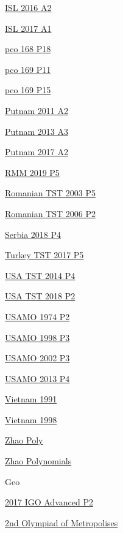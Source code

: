 \hyperref  [problem:ISL 2016 A2]{ISL 2016 A2}

\hyperref  [problem:ISL 2017 A1]{ISL 2017 A1}

\hyperref  [problem:pco 168 P18]{pco 168 P18}

\hyperref  [problem:pco 169 P11]{pco 169 P11}

\hyperref  [problem:pco 169 P15]{pco 169 P15}

\hyperref  [problem:Putnam 2011 A2]{Putnam 2011 A2}

\hyperref  [problem:Putnam 2013 A3]{Putnam 2013 A3}

\hyperref  [problem:Putnam 2017 A2]{Putnam 2017 A2}

\hyperref  [problem:RMM 2019 P5]{RMM 2019 P5}

\hyperref  [problem:Romanian TST 2003 P5]{Romanian TST 2003 P5}

\hyperref  [problem:Romanian TST 2006 P2]{Romanian TST 2006 P2}

\hyperref  [problem:Serbia 2018 P4]{Serbia 2018 P4}

\hyperref  [problem:Turkey TST 2017 P5]{Turkey TST 2017 P5}

\hyperref  [problem:USA TST 2014 P4]{USA TST 2014 P4}

\hyperref  [problem:USA TST 2018 P2]{USA TST 2018 P2}

\hyperref  [problem:USAMO 1974 P2]{USAMO 1974 P2}

\hyperref  [problem:USAMO 1998 P3]{USAMO 1998 P3}

\hyperref  [problem:USAMO 2002 P3]{USAMO 2002 P3}

\hyperref  [problem:USAMO 2013 P4]{USAMO 2013 P4}

\hyperref  [problem:Vietnam 1991]{Vietnam 1991}

\hyperref  [problem:Vietnam 1998]{Vietnam 1998}

\hyperref  [problem:Zhao Poly]{Zhao Poly}

\hyperref  [problem:Zhao Polynomials]{Zhao Polynomials}



\newpage Geo


\hyperref  [problem:2017 IGO Advanced P2]{2017 IGO Advanced P2}

\hyperref  [problem:2nd Olympiad of Metropolises]{2nd Olympiad of Metropolises}

\hyperref  [problem:]{}

\hyperref  [problem:]{}

\hyperref  [problem:]{}

